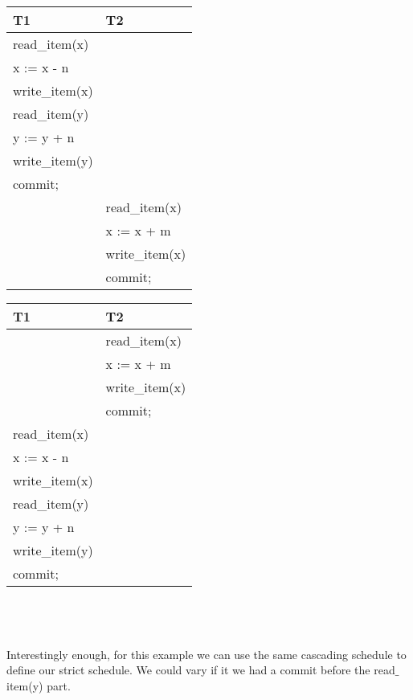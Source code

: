 \documentclass[12pt]{article}
\begin{document}
\begin{enumerate}
\begin{minipage}{.5\linewidth}
      \centering
       \begin{tabular}{|l|l|}
\hline
T1 & T2 \\ \hline
read\_item(x) &  \\ \hline
x := x - n &  \\ \hline
write\_item(x) &  \\ \hline
read\_item(y) &  \\ \hline
y := y + n &  \\ \hline
write\_item(y) &  \\ \hline
commit; &  \\ \hline
 & read\_item(x) \\ \hline
 & x := x + m \\ \hline
 & write\_item(x) \\ \hline
 & commit; \\ \hline
\end{tabular}
    \end{minipage}%
    \begin{minipage}{.5\linewidth}
      \centering

\begin{tabular}{|l|l|}
\hline
T1 & T2 \\ \hline
 & read\_item(x) \\ \hline
 & x := x + m \\ \hline
 & write\_item(x) \\ \hline
 & commit; \\ \hline
read\_item(x) &  \\ \hline
x := x - n &  \\ \hline
write\_item(x) &  \\ \hline
read\_item(y) &  \\ \hline
y := y + n &  \\ \hline
write\_item(y) &  \\ \hline
commit; &  \\ \hline
\end{tabular}
    \end{minipage} 
\\ \\ \\
Interestingly enough, for this example we can use the same cascading schedule to define our strict schedule. We could vary if it we had a commit before the read$\_$item(y) part. \\ 


\end{enumerate}
\end{document}
